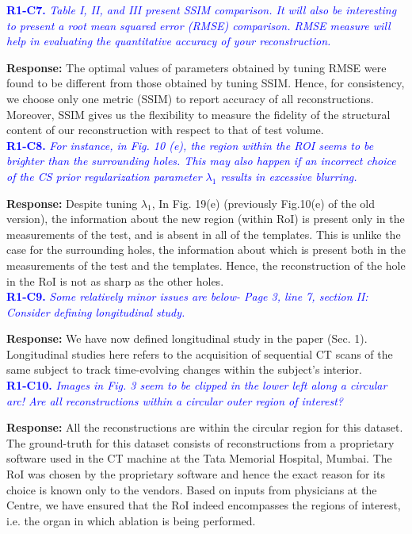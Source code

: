 \documentclass{article}
\begin{document}
\textcolor{blue}{\textbf{R1-C7.}\textit{ Table I, II, and III present SSIM comparison. It will also be interesting to present a root mean squared error (RMSE) comparison. RMSE measure will help in evaluating the quantitative accuracy of your reconstruction.}}

\textbf{Response:} The optimal values of parameters obtained by tuning RMSE were found to be different from those obtained by tuning SSIM. Hence, for consistency, we choose only one metric (SSIM) to report accuracy of all reconstructions.
Moreover, SSIM gives us the flexibility to measure the fidelity of the structural content of our reconstruction with respect to that of test volume.\\ 

\textcolor{blue}{\textbf{R1-C8.}\textit{ For instance, in Fig. 10 (e), the region within the ROI seems to be brighter than the surrounding holes. This may also happen if an incorrect choice of the CS prior regularization parameter $\lambda_1$ results in excessive blurring.}}
  
\textbf{Response:} Despite tuning $\lambda_1$, In Fig. 19(e) (previously Fig.10(e) of the old version), the information about the new region (within RoI)  is present only in the measurements of the test, and is absent in all of the templates. This is unlike the case for the surrounding holes, the information about which is present both in the measurements of the test and the templates. Hence, the reconstruction of the hole in the RoI is not as sharp as the other holes.\\

\textcolor{blue}{\textbf{R1-C9.}\textit{ Some relatively minor issues are below- Page 3, line 7, section II: Consider defining longitudinal study.}}
  
\textbf{Response:} We have now defined longitudinal study in the paper (Sec. 1). Longitudinal studies here refers to the acquisition of sequential CT scans of the same subject to track time-evolving changes within the subject's interior.  \\

\textcolor{blue}{\textbf{R1-C10.} \textit{ Images in Fig. 3 seem to be clipped in the lower left along a circular arc! Are all reconstructions within a circular outer region of interest?}}

\textbf{Response:} All the reconstructions are within the circular region for this dataset. The ground-truth for this dataset consists of reconstructions from a proprietary software used in the CT machine at the Tata Memorial Hospital, Mumbai. The  RoI was chosen by the proprietary software and hence the exact reason for its choice is known only to the vendors. Based on inputs from physicians at the Centre, we have ensured that the RoI indeed encompasses the regions of interest, i.e. the organ in which ablation is being performed.\\
\end{document}
